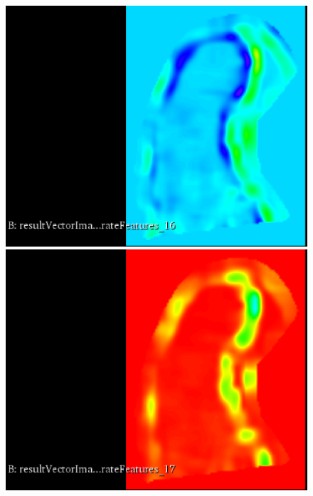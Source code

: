 \documentclass{InsightArticle}
\begin{document}
\begin{figure}[H]
  \begin{center}
    \includegraphics[scale=0.3]{figures/ClusterShade.eps}
    \includegraphics[scale=0.3]{figures/ClusterProminence.eps}

\end{center}
\end{figure}
\end{document}
